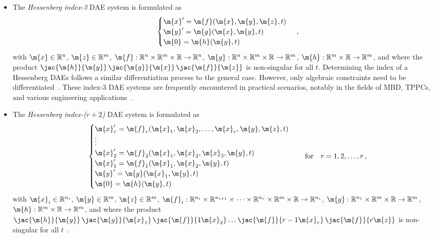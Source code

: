 \begin{itemize}
  \item The \emph{Hessenberg index-3} \ac{DAE} system is formulated as
  \begin{equation*}
    \begin{cases}
      \m{x}^\prime = \m{f}(\m{x}, \m{y}, \m{z}, t) \\
      \m{y}^\prime = \m{g}(\m{x}, \m{y}, t) \\
      \m{0}        = \m{h}(\m{y}, t)
    \end{cases} \, \text{,}
  \end{equation*}
  with $\m{x} \in \mathbb{R}^n$, $\m{z} \in \mathbb{R}^m$, $\m{f}: \mathbb{R}^{n} \times \mathbb{R}^{m} \times \mathbb{R} \rightarrow \mathbb{R}^{n}$, $\m{g}: \mathbb{R}^{n} \times \mathbb{R}^{m} \times \mathbb{R} \rightarrow \mathbb{R}^{m}$, $\m{h}: \mathbb{R}^{m} \times \mathbb{R} \rightarrow \mathbb{R}^{m}$, and where the product $\jac{\m{h}}{\m{y}} \, \jac{\m{g}}{\m{x}} \, \jac{\m{f}}{\m{z}}$ is non-singular for all $t$. Determining the index of a Hessenberg \acp{DAE} follows a similar differentiation process to the general case. However, only algebraic constraints need to be differentiated~\cite{ascher1991projected}. These index-3 \ac{DAE} systems are frequently encountered in practical scenarios, notably in the fields of \ac{MBD}, \acp{TPPC}, and various engineering applications~\cite{ascher1998computer,brenan1995numerical}.
  \item The \emph{Hessenberg index-($r+2$)} \ac{DAE} system is formulated as
  \begin{equation*}
    \begin{cases}
      \m{x}_r^\prime = \m{f}_r(\m{x}_1, \m{x}_2, \dots, \m{x}_r, \m{y}, \m{z}, t) \\
      \vdots \\
      \m{x}_2^\prime = \m{f}_2(\m{x}_1, \m{x}_2, \m{x}_3, \m{y}, t) \\
      \m{x}_1^\prime = \m{f}_1(\m{x}_1, \m{x}_2, \m{y}, t) \\
      \m{y}^\prime = \m{g}(\m{x}_1, \m{y}, t) \\
      \m{0}        = \m{h}(\m{y}, t)
    \end{cases} \quad \text{for} \quad r = 1, 2, \dots, r \, \text{,}
  \end{equation*}
  with $\m{x}_i \in \mathbb{R}^{n_i}$, $\m{y} \in \mathbb{R}^m$, $\m{z} \in \mathbb{R}^m$, $\m{f}_i: \mathbb{R}^{n_i} \times \mathbb{R}^{n_{i+1}} \times \dots \times \mathbb{R}^{n_r} \times \mathbb{R}^{m} \times \mathbb{R} \rightarrow \mathbb{R}^{n_i}$, $\m{g}: \mathbb{R}^{n_1} \times \mathbb{R}^{m} \times \mathbb{R} \rightarrow \mathbb{R}^{m}$, $\m{h}: \mathbb{R}^{m} \times \mathbb{R} \rightarrow \mathbb{R}^{m}$, and where the product $\jac{\m{h}}{\m{y}} \, \jac{\m{g}}{\m{x}_1} \, \jac{\m{f}}{1\m{x}_2} \dots \jac{\m{f}}{r-1\m{x}_r} \, \jac{\m{f}}{r\m{z}}$ is non-singular for all $t$~\cite[Section 3.5]{lamour2013differential}.
\end{itemize}

